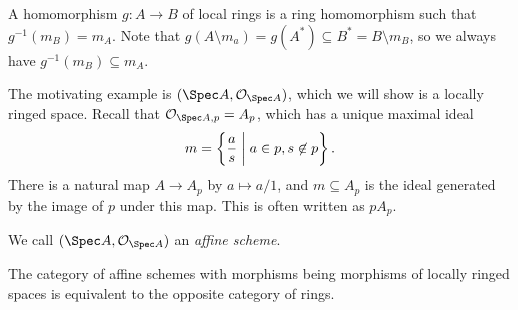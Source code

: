 \documentclass[12pt]{article}
\begin{document}
A homomorphism  $g : A \to B$ of local rings is a ring homomorphism such that $g^{-1}(m_B) = m_A$. Note that $g(A \setminus m_a) = g(A^\ast) \subseteq B^\ast = B \setminus m_B$, so we always have $g^{-1}(m_B) \subseteq m_A$.

The motivating example is $(\Spec A, \mathcal{O}_{\Spec A})$, which we will show is a locally ringed space. Recall that $\mathcal{O}_{\Spec A, p} = A_p$, which has a unique maximal ideal
\[
m = \left\{ \frac{a}{s} \biggm| a \in p, s \not \in p\right\}.
\]
There is a natural map $A \to A_p$ by $a \mapsto a/1$, and $m \subseteq A_p$ is the ideal generated by the image of $p$ under this map. This is often written as $p A_p$.

We call $(\Spec A, \mathcal{O}_{\Spec A})$ an \emph{affine scheme}.

\begin{theorem}
	The category of affine schemes with morphisms being morphisms of locally ringed spaces is equivalent to the opposite category of rings.
\end{theorem}
\end{document}
